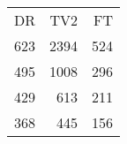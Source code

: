 \begin{tabular}{rrr}
\toprule
 DR &  TV2 &  FT \\
623 & 2394 & 524 \\
\midrule
495 & 1008 & 296 \\
429 &  613 & 211 \\
368 &  445 & 156 \\
\bottomrule
\end{tabular}
